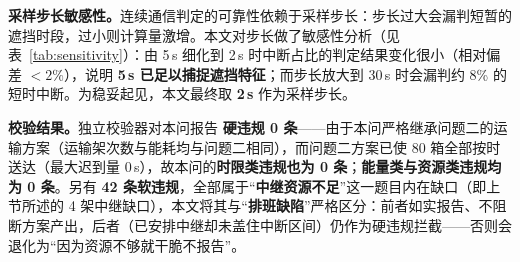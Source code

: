\textbf{采样步长敏感性。}连续通信判定的可靠性依赖于采样步长：步长过大会漏判短暂的遮挡时段，过小则计算量激增。本文对步长做了敏感性分析（见表~\ref{tab:sensitivity}）：由 5\,s 细化到 2\,s 时中断占比的判定结果变化很小（相对偏差 $<2\%$），说明 \textbf{5\,s 已足以捕捉遮挡特征}；而步长放大到 30\,s 时会漏判约 8\% 的短时中断。为稳妥起见，本文最终取 \textbf{2\,s} 作为采样步长。

\textbf{校验结果。}独立校验器对本问报告 \textbf{硬违规 0 条}——由于本问严格继承问题二的运输方案（运输架次数与能耗均与问题二相同），而问题二方案已使 80 箱全部按时送达（最大迟到量 0\,s），故本问的\textbf{时限类违规也为 0 条}；\textbf{能量类与资源类违规均为 0 条}。另有 \textbf{42 条软违规}，全部属于“\textbf{中继资源不足}”这一题目内在缺口（即上节所述的 4 架中继缺口），本文将其与“\textbf{排班缺陷}”严格区分：前者如实报告、不阻断方案产出，后者（已安排中继却未盖住中断区间）仍作为硬违规拦截——否则会退化为“因为资源不够就干脆不报告”。
